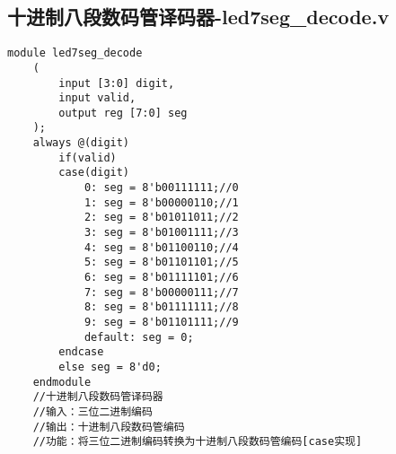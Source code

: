 	\subsection{十进制八段数码管译码器-led7seg\_decode.v}
	\begin{lstlisting}[style=verilog]
	module led7seg_decode
	(
		input [3:0] digit,
		input valid,
		output reg [7:0] seg
	);
	always @(digit)
		if(valid)
		case(digit)
			0: seg = 8'b00111111;//0
			1: seg = 8'b00000110;//1
			2: seg = 8'b01011011;//2
			3: seg = 8'b01001111;//3
			4: seg = 8'b01100110;//4
			5: seg = 8'b01101101;//5
			6: seg = 8'b01111101;//6
			7: seg = 8'b00000111;//7
			8: seg = 8'b01111111;//8
			9: seg = 8'b01101111;//9
			default: seg = 0;
		endcase
		else seg = 8'd0;
	endmodule
	//十进制八段数码管译码器
	//输入：三位二进制编码
	//输出：十进制八段数码管编码
	//功能：将三位二进制编码转换为十进制八段数码管编码[case实现]
	\end{lstlisting}
	\newpage
